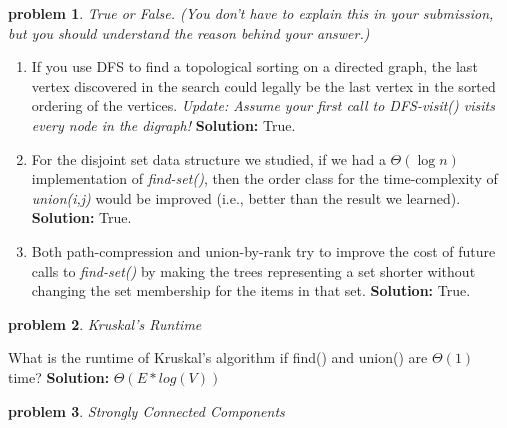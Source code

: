 \documentclass[10pt]{article}
\newcommand{\solution}[1]{\color{blue}\hfill\break\noindent\textbf{Solution:} #1\color{black}}
\newtheorem{problem}{\sc\color{cit}problem}
\begin{document}
\begin{problem} True or False. (You don't have to explain this in your submission, but you should understand the reason behind your answer.)  \end{problem}

\begin{enumerate}
\renewcommand{\theenumi}{\Alph{enumi}}

    \item  If you use DFS to find a topological sorting on a directed graph, the last vertex discovered in the search could legally be the last vertex in the sorted ordering of the vertices. {\em Update: Assume your first call to DFS-visit() visits every node in the digraph!}
    \solution{
    True.
    }
    
    \item For the disjoint set data structure we studied, if we had a $\Theta(\log n)$ implementation of \emph{find-set()}, then the order class for the time-complexity of \emph{union(i,j)} would be improved (i.e., better than the result we learned).
    \solution{
    True.
    }
    
    \item Both path-compression and union-by-rank try to improve the cost of future calls to \emph{find-set()} by making the trees representing a set shorter without changing the set membership for the items in that set.
    \solution{
    True.
    }
    
\end{enumerate}

\begin{problem} Kruskal's Runtime \end{problem}
What is the runtime of Kruskal’s algorithm if find() and union() are $\Theta(1)$ time?
\solution{
    $\Theta (E*log(V))$
}

\begin{problem} Strongly Connected Components \end{problem}
\end{document}
